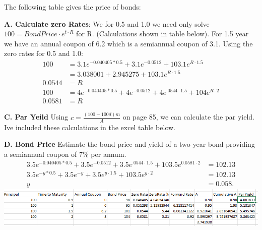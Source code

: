 \documentclass[12pt]{article}
\newenvironment{problem}[3][Problem]{\begin{trivlist}
\item[\hskip \labelsep {\bfseries #1}\hskip \labelsep {\bfseries #2.}]}{\end{trivlist}}
\begin{document}
\begin{problem}{4.34}. The following table gives the price of bonds: 

\textbf{A. Calculate zero Rates}: We for 0.5 and 1.0 we need only solve $100=BondPrice \cdot e^{t\cdot R}$ for R. (Calculations shown in table below). For 1.5 year we have an annual coupon of 6.2 which is a semiannual coupon of 3.1. Using the zero rates for 0.5 and 1.0: 
\begin{align*}
100 &=  3.1e^{-0.040405*0.5} + 3.1e^{-0.0512} + 103.1e^{R\cdot 1.5}\\
& =  3.038001 + 2.945275 + 103.1e^{R\cdot 1.5} \\
0.0544 &= R \\
100 &=  4e^{-0.040405*0.5} + 4e^{-0.0512} + 4e^{.0544 \cdot 1.5} + 104e^{R\cdot 2} \\
0.0581 &= R
\end{align*}

\textbf{C. Par Yeild} Using $c=\frac{(100-100d)m}{A}$ on page 85, we can calculate the par yield. Ive included these calculations in the excel table below.

\textbf{D. Bond Price}  Estimate the bond price and yield of a two year bond providing a semiannual coupon of 7\% per annum. 
\begin{align*}
 3.5e^{-0.040405*0.5} + 3.5e^{-0.0512} + 3.5e^{.0544 \cdot 1.5} + 103.5e^{0.0581\cdot 2} &= 102.13 \\
 3.5e^{-y*0.5} + 3.5e^{-y} + 3.5e^{y \cdot 1.5} + 103.5e^{y\cdot 2} &= 102.13 \\
y&= 0.058. 
\end{align*}
\includegraphics[width=\textwidth]{mod3_p434.png}


\end{problem}
\end{document}
